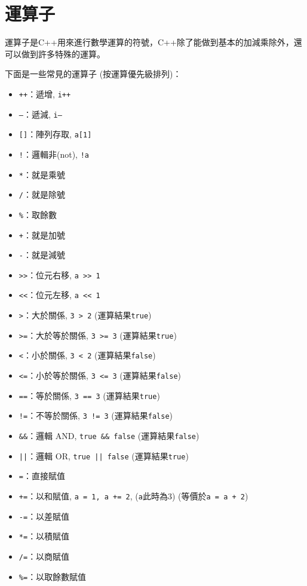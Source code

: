 \documentclass[a4paper, 11pt, oneside]{book}
\begin{document}
\section{運算子}
運算子是C++用來進行數學運算的符號，C++除了能做到基本的加減乘除外，還可以做到許多特殊的運算。

下面是一些常見的運算子 (按運算優先級排列)：
\begin{itemize}
\item \texttt{++}：遞增, \texttt{i++}
\item \texttt{--}：遞減, \texttt{i--}
\item \texttt{[]}：陣列存取, \texttt{a[1]}
\item \texttt{!}：邏輯非(not), \texttt{!a}
\item \texttt{*}：就是乘號
\item \texttt{/}：就是除號
\item \texttt{\%}：取餘數
\item \texttt{+}：就是加號
\item \texttt{-}：就是減號
\item \texttt{>>}：位元右移, \texttt{a >> 1}
\item \texttt{<<}：位元左移, \texttt{a << 1}
\item \texttt{>}：大於關係, \texttt{3 > 2} (運算結果\texttt{true})
\item \texttt{>=}：大於等於關係, \texttt{3 >= 3} (運算結果\texttt{true})
\item \texttt{<}：小於關係, \texttt{3 < 2} (運算結果\texttt{false})
\item \texttt{<=}：小於等於關係, \texttt{3 <= 3} (運算結果\texttt{false})
\item \texttt{==}：等於關係, \texttt{3 == 3} (運算結果\texttt{true})
\item \texttt{!=}：不等於關係, \texttt{3 != 3} (運算結果\texttt{false})
\item \texttt{\&\&}：邏輯 AND, \texttt{true \&\& false} (運算結果\texttt{false})
\item \texttt{||}：邏輯 OR, \texttt{true || false} (運算結果\texttt{true})
\item \texttt{=}：直接賦值
\item \texttt{+=}：以和賦值, \texttt{a = 1, a += 2}, (\texttt{a}此時為3) (等價於\texttt{a = a + 2})
\item \texttt{-=}：以差賦值
\item \texttt{*=}：以積賦值
\item \texttt{/=}：以商賦值
\item \texttt{\%=}：以取餘數賦值
\end{itemize}
\end{document}
